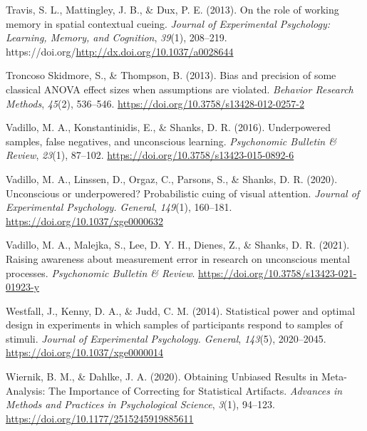 \documentclass[
  man]{apa6}
\newlength{\cslhangindent}
\newlength{\cslentryspacingunit} %
\newenvironment{CSLReferences}[2] %
 {%
  \setlength{\parindent}{0pt}
  \ifodd #1
  \let\oldpar\par
  \def\par{\hangindent=\cslhangindent\oldpar}
  \fi
  \setlength{\parskip}{#2\cslentryspacingunit}
 }%
 {}
\begin{document}
\begin{CSLReferences}{1}{0}
\leavevmode{}%
Travis, S. L., Mattingley, J. B., \& Dux, P. E. (2013). On the role of working memory in spatial contextual cueing. \emph{Journal of Experimental Psychology: Learning, Memory, and Cognition}, \emph{39}(1), 208--219. https://doi.org/\url{http://dx.doi.org/10.1037/a0028644}

\leavevmode{}%
Troncoso Skidmore, S., \& Thompson, B. (2013). Bias and precision of some classical {ANOVA} effect sizes when assumptions are violated. \emph{Behavior Research Methods}, \emph{45}(2), 536--546. \url{https://doi.org/10.3758/s13428-012-0257-2}

\leavevmode{}%
Vadillo, M. A., Konstantinidis, E., \& Shanks, D. R. (2016). Underpowered samples, false negatives, and unconscious learning. \emph{Psychonomic Bulletin \& Review}, \emph{23}(1), 87--102. \url{https://doi.org/10.3758/s13423-015-0892-6}

\leavevmode{}%
Vadillo, M. A., Linssen, D., Orgaz, C., Parsons, S., \& Shanks, D. R. (2020). Unconscious or underpowered? {Probabilistic} cuing of visual attention. \emph{Journal of Experimental Psychology. General}, \emph{149}(1), 160--181. \url{https://doi.org/10.1037/xge0000632}

\leavevmode{}%
Vadillo, M. A., Malejka, S., Lee, D. Y. H., Dienes, Z., \& Shanks, D. R. (2021). Raising awareness about measurement error in research on unconscious mental processes. \emph{Psychonomic Bulletin \& Review}. \url{https://doi.org/10.3758/s13423-021-01923-y}

\leavevmode{}%
Westfall, J., Kenny, D. A., \& Judd, C. M. (2014). Statistical power and optimal design in experiments in which samples of participants respond to samples of stimuli. \emph{Journal of Experimental Psychology. General}, \emph{143}(5), 2020--2045. \url{https://doi.org/10.1037/xge0000014}

\leavevmode{}%
Wiernik, B. M., \& Dahlke, J. A. (2020). Obtaining {Unbiased Results} in {Meta-Analysis}: {The Importance} of {Correcting} for {Statistical Artifacts}. \emph{Advances in Methods and Practices in Psychological Science}, \emph{3}(1), 94--123. \url{https://doi.org/10.1177/2515245919885611}

\end{CSLReferences}
\end{document}
